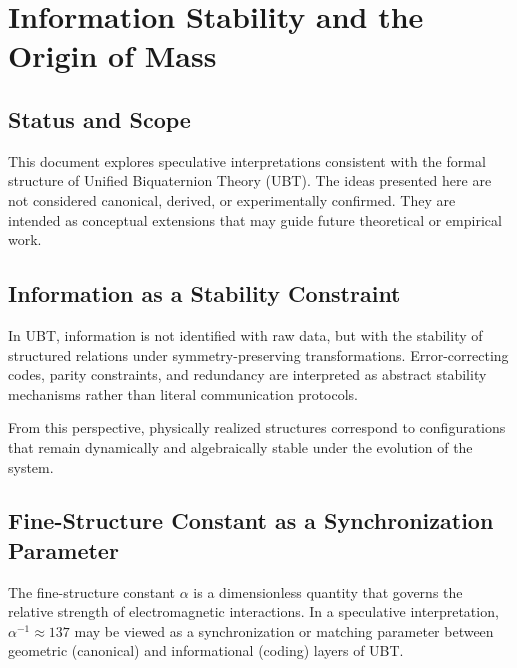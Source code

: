 
\section*{Information Stability and the Origin of Mass}

\subsection*{Status and Scope}

This document explores speculative interpretations consistent with the formal
structure of Unified Biquaternion Theory (UBT). The ideas presented here are not
considered canonical, derived, or experimentally confirmed. They are intended
as conceptual extensions that may guide future theoretical or empirical work.

\subsection*{Information as a Stability Constraint}

In UBT, information is not identified with raw data, but with the stability of
structured relations under symmetry-preserving transformations. Error-correcting
codes, parity constraints, and redundancy are interpreted as abstract stability
mechanisms rather than literal communication protocols.

From this perspective, physically realized structures correspond to configurations
that remain dynamically and algebraically stable under the evolution of the system.

\subsection*{Fine-Structure Constant as a Synchronization Parameter}

The fine-structure constant $\alpha$ is a dimensionless quantity that governs the
relative strength of electromagnetic interactions. In a speculative interpretation,
$\alpha^{-1}\approx 137$ may be viewed as a synchronization or matching parameter
between geometric (canonical) and informational (coding) layers of UBT.

